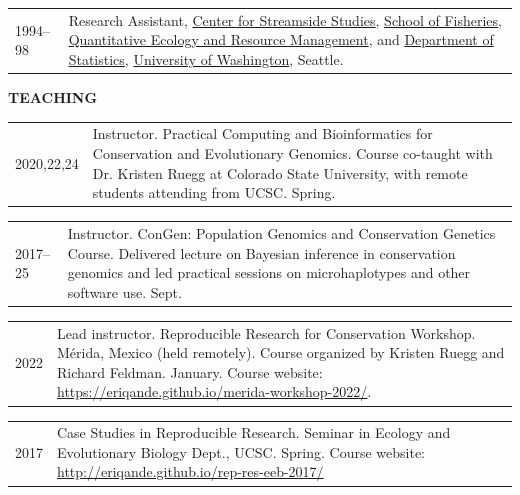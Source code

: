 \documentclass[11pt]{article}
\newlength{\myindent}
\newlength{\postskip}
\newlength{\preskip}
\newlength{\scndcol}
\begin{document}
\begin{tabular}{ @{}p{2.5\myindent} p{\scndcol}@{}  }
\hspace*{\myindent}1994--98 &  Research Assistant, \href{http://depts.washington.edu/cssuw/}{Center for Streamside
Studies},  \href{http://www.fish.washington.edu/}{School of Fisheries}, \href{http://depts.washington.edu/qerm/}{Quantitative Ecology and Resource
Management}, and \href{http://www.stat.washington.edu/}{Department of Statistics}, \href{http://www.washington.edu/}{University of Washington}, Seattle. \\
\end{tabular}
\vspace*{\postskip}


{\bf TEACHING}
\vspace*{\preskip}


\begin{tabular}{ @{}p{2.5\myindent} p{\scndcol}@{}  }
\hspace*{\myindent}2020,22,24 &  Instructor.  Practical Computing and Bioinformatics for Conservation and Evolutionary Genomics. Course co-taught with Dr. Kristen Ruegg at Colorado State University, with remote students attending from UCSC. Spring.
\end{tabular}

\begin{tabular}{ @{}p{2.5\myindent} p{\scndcol}@{}  }
\hspace*{\myindent}2017--25 &  Instructor.  ConGen: Population Genomics and Conservation Genetics Course. Delivered lecture on Bayesian inference in conservation genomics and led practical sessions on microhaplotypes and other software use. Sept.
\end{tabular}


\begin{tabular}{ @{}p{2.5\myindent} p{\scndcol}@{}  }
\hspace*{\myindent}2022 &  Lead instructor. Reproducible Research for Conservation Workshop. Mérida, Mexico (held remotely). Course organized by Kristen Ruegg and Richard Feldman. January. Course website: \url{https://eriqande.github.io/merida-workshop-2022/}.  
\end{tabular}


\begin{tabular}{ @{}p{2.5\myindent} p{\scndcol}@{}  }
\hspace*{\myindent}2017 &  Case Studies in Reproducible Research. Seminar in Ecology and Evolutionary
Biology Dept., UCSC. Spring.  Course website: \url{http://eriqande.github.io/rep-res-eeb-2017/}
\end{tabular}
\end{document}
